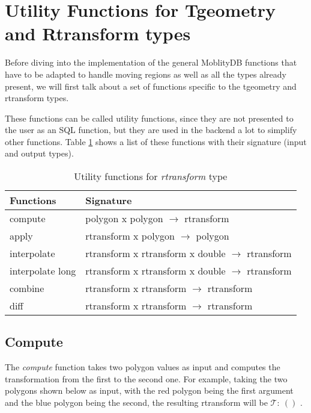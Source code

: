 \section{Utility Functions for Tgeometry and Rtransform types}

Before diving into the implementation of the general MoblityDB functions that have to be adapted to handle moving regions as well as all the types already present, we will first talk about a set of functions specific to the tgeometry and rtransform types.

These functions can be called utility functions, since they are not presented to the user as an SQL function, but they are used in the backend a lot to simplify other functions. Table \ref{table:rtransform_functions} shows a list of these functions with their signature (input and output types).

\begin{table}[h!]
    \centering
    \begin{tabular}[c]{|l|l|} 
    \hline
    \textbf{Functions}  & \textbf{Signature} \\ 
    \hline
    compute             & polygon    x polygon              $\rightarrow$ rtransform \\
    apply               & rtransform x polygon              $\rightarrow$ polygon \\
    \hline
    interpolate         & rtransform x rtransform x double  $\rightarrow$ rtransform \\
    interpolate long    & rtransform x rtransform x double  $\rightarrow$ rtransform \\
    \hline
    combine             & rtransform x rtransform           $\rightarrow$ rtransform \\
    diff                & rtransform x rtransform           $\rightarrow$ rtransform \\
    \hline
    \end{tabular}
    \caption{Utility functions for \textit{rtransform} type}
    \label{table:rtransform_functions}
\end{table}

\subsection{Compute}

The \textit{compute} function takes two polygon values as input and computes the transformation from the first to the second one. For example, taking the two polygons shown below as input, with the red polygon being the first argument and the blue polygon being the second, the resulting rtransform will be $\mathcal{T}:\ ()$ .

